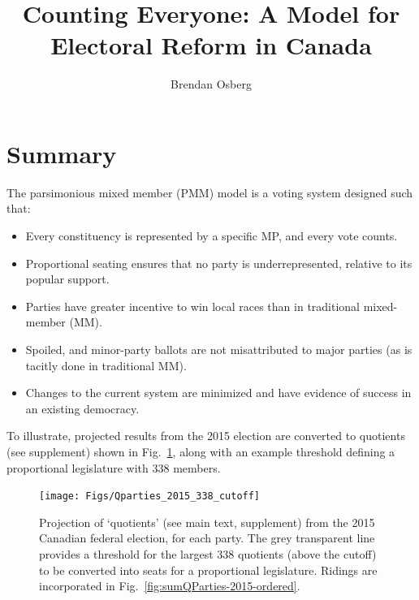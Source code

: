 \documentclass[DIV=calc, paper=a4, fontsize=11pt, twocolumn]{scrartcl}	 %
\title{Counting Everyone: A Model for Electoral Reform in Canada} %
\author{Brendan Osberg} %
\date{} %
\begin{document}
\thispagestyle{fancy} %


\section*{Summary}
\renewcommand{\thefigure}{S-\arabic{figure}}

The parsimonious mixed member (PMM) model is a voting system designed such that:

\begin{itemize}
\item Every constituency is represented by a specific MP, and every vote counts. 
\item Proportional seating ensures that no party is underrepresented, relative to its popular support. 
\item Parties have greater incentive to win local races than in traditional mixed-member (MM).
\item Spoiled, and minor-party ballots are not misattributed to major parties (as is tacitly done in traditional MM).
\item Changes to the current system are minimized and have evidence of success in an existing democracy.
\end{itemize}

To illustrate, projected results from the 2015 election are converted to quotients (see supplement) shown in Fig.~\ref{fig:sumQParties-2015-338-cutoff}, along with an example threshold defining a proportional legislature with 338 members. 
\begin{figure}[h!]
  \texttt{[image: Figs/Qparties\_2015\_338\_cutoff]}
  \caption{Projection of `quotients' (see main text, supplement) from the 2015 Canadian federal election, for each party. The grey transparent line provides a threshold for the largest 338 quotients (above the cutoff) to be converted into seats for a proportional legislature. Ridings are incorporated in Fig.~\ref{fig:sumQParties-2015-ordered}. }
\label{fig:sumQParties-2015-338-cutoff}
\end{figure}
\end{document}
